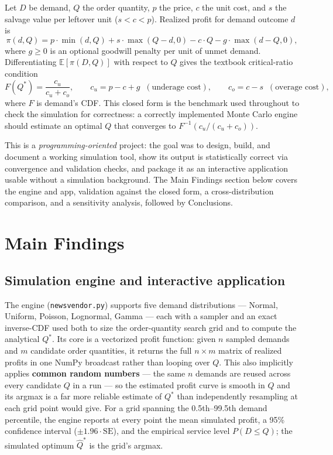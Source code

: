 \documentclass[11pt]{article}
\begin{document}
Let $D$ be demand, $Q$ the order quantity, $p$ the price, $c$ the unit cost, and $s$ the salvage
value per leftover unit ($s<c<p$). Realized profit for demand outcome $d$ is
\[
\pi(d, Q) = p \cdot \min(d, Q) + s \cdot \max(Q - d, 0) - c \cdot Q - g \cdot \max(d - Q, 0),
\]
where $g \geq 0$ is an optional goodwill penalty per unit of unmet demand. Differentiating
$\mathbb{E}[\pi(D,Q)]$ with respect to $Q$ gives the textbook critical-ratio condition
\[
F(Q^*) = \frac{c_u}{c_u + c_o}, \qquad c_u = p - c + g \;\;(\text{underage cost}), \qquad
c_o = c - s \;\;(\text{overage cost}),
\]
where $F$ is demand's CDF. This closed form is the benchmark used throughout to check the
simulation for correctness: a correctly implemented Monte Carlo engine should estimate an optimal
$Q$ that converges to $F^{-1}(c_u/(c_u+c_o))$.

This is a \emph{programming-oriented} project: the goal was to design, build, and document a
working simulation tool, show its output is statistically correct via convergence and validation
checks, and package it as an interactive application usable without a simulation background. The
Main Findings section below covers the engine and app, validation against the closed form, a
cross-distribution comparison, and a sensitivity analysis, followed by Conclusions.

\section*{Main Findings}

\subsection*{Simulation engine and interactive application}
The engine (\texttt{newsvendor.py}) supports five demand distributions --- Normal, Uniform,
Poisson, Lognormal, Gamma --- each with a sampler and an exact inverse-CDF used both to size the
order-quantity search grid and to compute the analytical $Q^*$. Its core is a vectorized profit
function: given $n$ sampled demands and $m$ candidate order quantities, it returns the full
$n\times m$ matrix of realized profits in one NumPy broadcast rather than looping over $Q$. This
also implicitly applies \textbf{common random numbers} --- the same $n$ demands are reused across
every candidate $Q$ in a run --- so the estimated profit curve is smooth in $Q$ and its argmax is
a far more reliable estimate of $Q^*$ than independently resampling at each grid point would give.
For a grid spanning the 0.5th--99.5th demand percentile, the engine reports at every point the
mean simulated profit, a 95\% confidence interval ($\pm1.96\cdot\mathrm{SE}$), and the empirical
service level $P(D\le Q)$; the simulated optimum $\hat{Q}^*$ is the grid's argmax.
\end{document}
